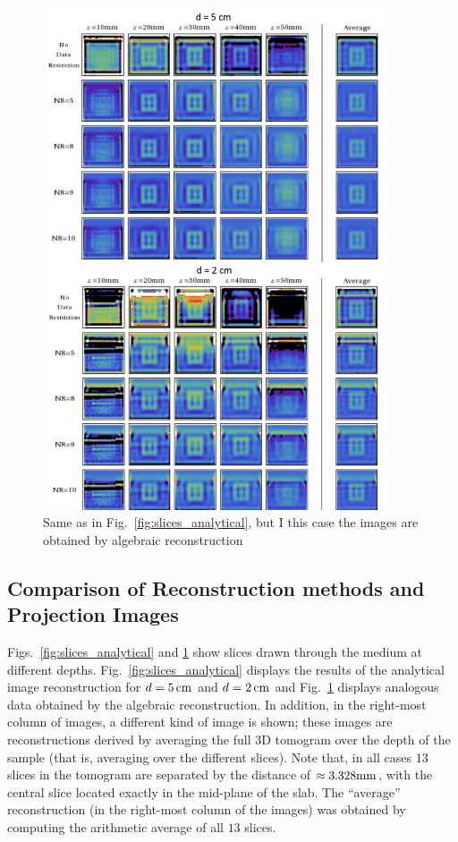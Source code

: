 \begin{figure}[p]
\centering
\includegraphics[width=0.9\textwidth]{./figures/3_Chestwall/algslices.png}
\caption[Algebraic reconstruction images at various depths]{Same as in Fig.~\ref{fig:slices_analytical}, but I this case the images are obtained by algebraic reconstruction}
\label{fig:slices_numerical}
\end{figure}

\subsection{Comparison of Reconstruction methods and Projection Images}
Figs.~\ref{fig:slices_analytical} and \ref{fig:slices_numerical} show slices drawn through the medium at different depths. Fig.~\ref{fig:slices_analytical} displays the results of the analytical image reconstruction for $d=5\,{\rm cm}$ and $d=2\,{\rm cm}$ and Fig.~\ref{fig:slices_numerical} displays analogous data obtained by the algebraic reconstruction. In addition, in the right-most column of images, a different kind of image is shown; these images are reconstructions derived by averaging the full 3D tomogram over the depth of the sample (that is, averaging over the different slices). Note that, in all cases $13$ slices in the tomogram are separated by the distance of $\approx 3.328{\rm mm}$, with the central slice located exactly in the mid-plane of the slab. The ``average'' reconstruction (in the right-most column of the images) was obtained by computing the arithmetic average of all $13$ slices.

